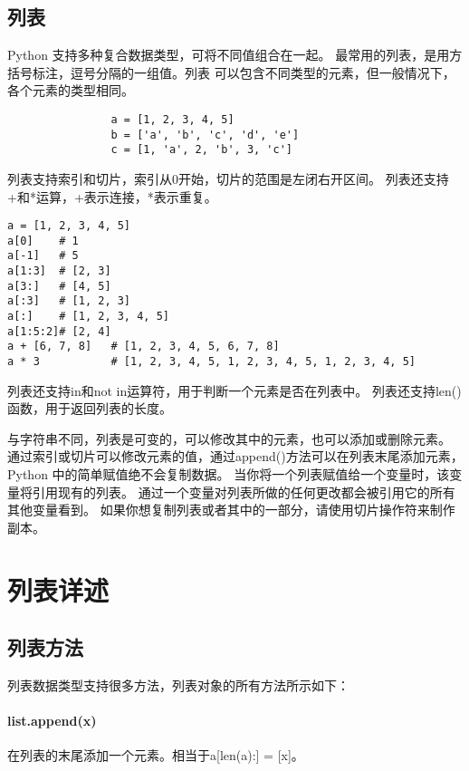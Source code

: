 \documentclass[a4paper, 12pt]{article}
\begin{document}
    \subsection{列表}
        Python 支持多种复合数据类型，可将不同值组合在一起。
        最常用的列表，是用方括号标注，逗号分隔的一组值。列表
        可以包含不同类型的元素，但一般情况下，各个元素的类型相同。\par
        \begin{listing}[h!]
            \begin{verbatim}
                a = [1, 2, 3, 4, 5]
                b = ['a', 'b', 'c', 'd', 'e']
                c = [1, 'a', 2, 'b', 3, 'c']
            \end{verbatim}
        \end{listing}
        列表支持索引和切片，索引从0开始，切片的范围是左闭右开区间。
        列表还支持+和*运算，+表示连接，*表示重复。\par
        \begin{listing}[h!]
            \begin{verbatim}
a = [1, 2, 3, 4, 5]
a[0]    # 1
a[-1]   # 5
a[1:3]  # [2, 3]
a[3:]   # [4, 5]
a[:3]   # [1, 2, 3]
a[:]    # [1, 2, 3, 4, 5]
a[1:5:2]# [2, 4]
a + [6, 7, 8]   # [1, 2, 3, 4, 5, 6, 7, 8]
a * 3           # [1, 2, 3, 4, 5, 1, 2, 3, 4, 5, 1, 2, 3, 4, 5]
            \end{verbatim}
        \end{listing}
        列表还支持in和not in运算符，用于判断一个元素是否在列表中。
        列表还支持len()函数，用于返回列表的长度。\par
        与字符串不同，列表是可变的，可以修改其中的元素，也可以添加或删除元素。
        通过索引或切片可以修改元素的值，通过append()方法可以在列表末尾添加元素，
        Python 中的简单赋值绝不会复制数据。 
        当你将一个列表赋值给一个变量时，该变量将引用现有的列表。
        通过一个变量对列表所做的任何更改都会被引用它的所有其他变量看到。
        如果你想复制列表或者其中的一部分，请使用切片操作符来制作副本。\par

    \section{列表详述}
        \subsection{列表方法}
            列表数据类型支持很多方法，列表对象的所有方法所示如下：
            \paragraph{list.append(x)} 在列表的末尾添加一个元素。相当于a[len(a):] = [x]。
\end{document}

